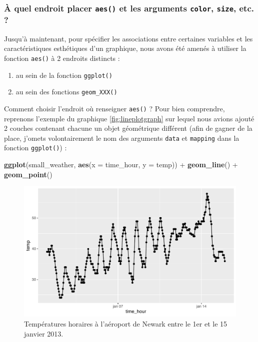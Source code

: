 \documentclass[a4paperpaper,]{article}
\newenvironment{Shaded}{\begin{snugshade}}{\end{snugshade}}
\newcommand{\DataTypeTok}[1]{\textcolor[rgb]{0.00,0.34,0.68}{#1}}
\newcommand{\KeywordTok}[1]{\textcolor[rgb]{0.12,0.11,0.11}{\textbf{#1}}}
\newcommand{\NormalTok}[1]{\textcolor[rgb]{0.12,0.11,0.11}{#1}}
\newcommand{\OperatorTok}[1]{\textcolor[rgb]{0.12,0.11,0.11}{#1}}
\newcommand{\StringTok}[1]{\textcolor[rgb]{0.75,0.01,0.01}{#1}}
\providecommand{\tightlist}{%
  \setlength{\itemsep}{0pt}\setlength{\parskip}{0pt}}
\begin{document}
\hypertarget{a-quel-endroit-placer-aes-et-les-arguments-color-size-etc.}{%
\subsubsection{\texorpdfstring{À quel endroit placer \texttt{aes()} et les arguments \texttt{color}, \texttt{size}, etc. ?}{À quel endroit placer aes() et les arguments color, size, etc. ?}}\label{a-quel-endroit-placer-aes-et-les-arguments-color-size-etc.}}

Jusqu'à maintenant, pour spécifier les associations entre certaines variables et les caractéristiques esthétiques d'un graphique, nous avons été amenés à utiliser la fonction \texttt{aes()} à 2 endroits distincts :

\begin{enumerate}
\def\labelenumi{\arabic{enumi}.}
\tightlist
\item
  au sein de la fonction \texttt{ggplot()}
\item
  au sein des fonctions \texttt{geom\_XXX()}
\end{enumerate}

Comment choisir l'endroit où renseigner \texttt{aes()} ? Pour bien comprendre, reprenons l'exemple du graphique \ref{fig:lineplotgraph} sur lequel nous avions ajouté 2 couches contenant chacune un objet géométrique différent (afin de gagner de la place, j'omets volontairement le nom des arguments \texttt{data} et \texttt{mapping} dans la fonction \texttt{ggplot()}) :

\begin{Shaded}
\begin{Highlighting}[]
\KeywordTok{ggplot}\NormalTok{(small_weather, }\KeywordTok{aes}\NormalTok{(}\DataTypeTok{x =}\NormalTok{ time_hour, }\DataTypeTok{y =}\NormalTok{ temp)) }\OperatorTok{+}
\StringTok{  }\KeywordTok{geom_line}\NormalTok{() }\OperatorTok{+}
\StringTok{  }\KeywordTok{geom_point}\NormalTok{()}
\end{Highlighting}
\end{Shaded}

\begin{figure}[htpb]

{\centering \includegraphics[width=0.9\linewidth]{figure/lineplotgraph2-1} 

}

\caption{Températures horaires à l'aéroport de Newark entre le 1er et le 15 janvier 2013.}\label{fig:lineplotgraph2}
\end{figure}
\end{document}
